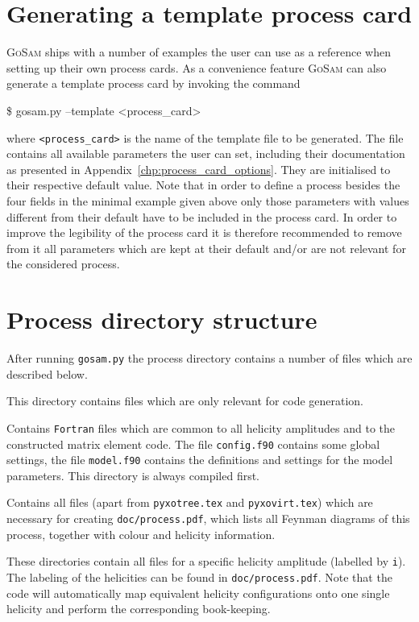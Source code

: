 \documentclass[11pt,a4paper]{refrep}
\newcommand{\gosam}{\textsc{GoSam}\xspace}
\begin{document}
\section{Generating a template process card}
\gosam ships with a number of examples the user can
use as a reference when setting up their own process cards. As a convenience feature \gosam can also generate a template process card by invoking the command
\begin{example}
\$ gosam.py --template <process\_card>
\end{example}
where \texttt{<process\_card>} is the name of the template file to be generated. The file contains all available parameters the user can set, including their documentation as presented in Appendix~\ref{chp:process_card_options}. They are initialised to their respective default value. Note that in order to define a process besides the four fields in the minimal example given above only those parameters with values different from their default have to be included in the process card. In order to improve the legibility of the process card it is therefore recommended to remove from it all parameters which are kept at their default and/or are not relevant for the considered process.


\section{Process directory structure}
After running \texttt{gosam.py} the
process directory contains a number of files which are described below.

 This directory contains files which are only
relevant for code ge\-ne\-ration.

 Contains {\tt Fortran} files which are common to all helicity
amplitudes and to the constructed matrix element code. 
The file {\tt config.f90} contains some global  settings, the file {\tt model.f90}
contains the definitions and settings for the model parameters.
This directory is always compiled first.

 Contains all files (apart from
\texttt{pyxotree.tex} and \texttt{pyxovirt.tex}) which are
necessary for creating
\texttt{doc/process.pdf}, which lists all Feynman diagrams of this process, 
together with colour and helicity information.

 These directories contain all files for a specific
helicity amplitude (labelled by {\tt i}). The labeling of the helicities can be found in
\texttt{doc/process.pdf}. 
Note that the code will automatically map equivalent helicity 
configurations onto one single helicity and perform the corresponding book-keeping.
\end{document}
